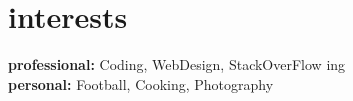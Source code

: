 \documentclass[]{friggeri-cv} %
\begin{document}


		






\section{interests}

\textbf{professional:} Coding, WebDesign, StackOverFlow ing\\
\textbf{personal:} Football, Cooking, Photography
\end{document}

